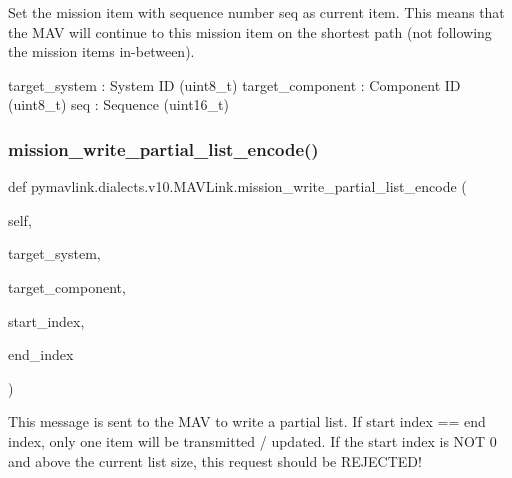 \begin{DoxyVerb}
\begin{DoxyVerb}
\begin{DoxyVerb}
\begin{DoxyVerb}
\begin{DoxyVerb}Set the mission item with sequence number seq as current item. This
means that the MAV will continue to this mission item
on the shortest path (not following the mission items
in-between).

target_system             : System ID (uint8_t)
target_component          : Component ID (uint8_t)
seq                       : Sequence (uint16_t)\end{DoxyVerb}
 \mbox{\label{classpymavlink_1_1dialects_1_1v10_1_1MAVLink_a3f1a00e9239f748f4aabecea583064f5}} 
\subsubsection{\texorpdfstring{mission\+\_\+write\+\_\+partial\+\_\+list\+\_\+encode()}{mission\_write\_partial\_list\_encode()}}
{\footnotesize\ttfamily def pymavlink.\+dialects.\+v10.\+M\+A\+V\+Link.\+mission\+\_\+write\+\_\+partial\+\_\+list\+\_\+encode (\begin{DoxyParamCaption}\item[{}]{self,  }\item[{}]{target\+\_\+system,  }\item[{}]{target\+\_\+component,  }\item[{}]{start\+\_\+index,  }\item[{}]{end\+\_\+index }\end{DoxyParamCaption})}

\begin{DoxyVerb}This message is sent to the MAV to write a partial list. If start
index == end index, only one item will be transmitted
/ updated. If the start index is NOT 0 and above the
current list size, this request should be REJECTED!


\end{DoxyVerb}
\end{DoxyVerb}
\end{DoxyVerb}
\end{DoxyVerb}
\end{DoxyVerb}
